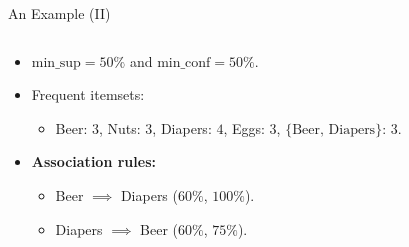 \begin{frame}{An Example (II)}
\begin{columns}
\begin{column}{0.5\textwidth}
\begin{itemize}
\begin{itemize}
					      \item $\text{min\_sup} = 50\%$ and $\text{min\_conf} =
						            50\%$.
					      \item Frequent itemsets:
					            \begin{itemize}
						            \item Beer: $3$, Nuts: $3$, Diapers: $4$, Eggs: $3$,
						                  $\{\text{Beer, Diapers}\}$: $3$.
					            \end{itemize}
					      \item \textbf{Association rules:}
					            \begin{itemize}
						            \item Beer $\implies$ Diapers ($60\%$, $100\%$).
						            \item Diapers $\implies$ Beer ($60\%$, $75\%$).
					            \end{itemize}
				      \end{itemize}
			\end{itemize}
		\end{column}
	\end{columns}
\end{frame}

